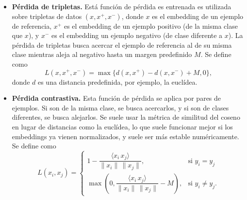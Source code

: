 \begin{itemize}
    \item \textbf{Pérdida de tripletas.} Está función de pérdida es entrenada es utilizada sobre tripletas de datos $(x, x^+, x^-)$, donde $x$ es el embedding de un ejemplo de referencia, $x^+$ es el embedding de un ejemplo positivo (de la misma clase que $x$), y $x^-$ es el embedding un ejemplo negativo (de clase diferente a $x$). La pérdida de tripletas busca acercar el ejemplo de referencia al de su misma clase mientras aleja al negativo hasta un margen predefinido $M$. Se define como
    \[L(x, x^+, x^-) = \max\{d(x,x^+)-d(x,x^-) + M, 0 \},\]
    donde $d$ es una distancia predefinida, por ejemplo, la euclídea.

    \item \textbf{Pérdida contrastiva.} Esta función de pérdida se aplica por pares de ejemplos. Si son de la misma clase, se busca acercarlos, y si son de clases diferentes, se busca alejarlos. Se suele usar la métrica de similitud del coseno en lugar de distancias como la euclídea, lo que suele funcionar mejor si los embeddings ya vienen normalizados, y suele ser más estable numéricamente. Se define como
    \[L(x_i, x_j) = 
\begin{cases}
1 - \dfrac{\langle x_i \, x_j\rangle}{\|x_i\| \, \|x_j\|}, & \text{si } y_i = y_j \\[6pt]
\max \left(0, \dfrac{\langle x_i \, x_j\rangle}{\|x_i\| \, \|x_j\|} - M \right), & \text{si } y_i \ne y_j.
\end{cases}\]

\end{itemize}


\endinput
